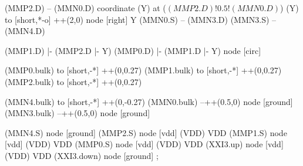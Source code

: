 \begin{circuitikz}[american]
	(MMP2.D) -- (MMN0.D)
	coordinate (Y) at ($(MMP2.D)!0.5!(MMN0.D)$)
	(Y) to [short,*-o] ++(2,0) node [right] {Y}
	(MMN0.S) -- (MMN3.D)
	(MMN3.S) -- (MMN4.D)
	
	(MMP1.D) |- (MMP2.D |- Y)
	(MMP0.D) |- (MMP1.D |- Y) node [circ] {}
	
	(MMP0.bulk) to [short,-*] ++(0,0.27)
	(MMP1.bulk) to [short,-*] ++(0,0.27)
	(MMP2.bulk) to [short,-*] ++(0,0.27)
	
	(MMN4.bulk) to [short,-*] ++(0,-0.27)
	(MMN0.bulk) --++(0.5,0) node [ground] {}
	(MMN3.bulk) --++(0.5,0) node [ground] {}


	(MMN4.S) node [ground] {}
	(MMP2.S) node [vdd] (VDD) {VDD}
	(MMP1.S) node [vdd] (VDD) {VDD}
	(MMP0.S) node [vdd] (VDD) {VDD}
	(XXI3.up) node [vdd] (VDD) {VDD}
	(XXI3.down) node [ground] {}
;

\end{circuitikz}
